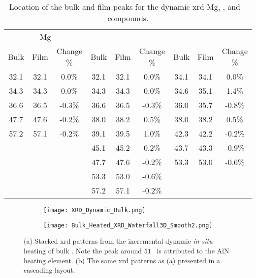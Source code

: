 \documentclass[a4paper,12pt,oneside]{article}%
\begin{document}
\begin{table}[h]
	\centering
	\caption{Location of the bulk and film peaks for the dynamic \acrshort{xrd} Mg, \MgZn, and \CaMgZnFive~ compounds.}
	\begin{tabular}{ c c c c c c c c c }
		\toprule
		\multicolumn{3}{c}{Mg} & \multicolumn{3}{c}{\MgZn} & \multicolumn{3}{c}{\CaMgZnFive} \\
		Bulk & Film & Change \% & Bulk & Film & Change \% & Bulk & Film & Change \% \\
		\midrule
		32.1 & 32.1 & 0.0\%  & 32.1 & 32.1   & 0.0\%  & 34.1 & 34.1 & 0.0\% \\
		34.3 & 34.3 & 0.0\%  & 34.3 & 34.3   & 0.0\%  & 34.6 & 35.1 & 1.4\% \\
		36.6 & 36.5 & -0.3\% & 36.6 & 36.5   & -0.3\% & 36.0 & 35.7 & -0.8\% \\
		47.7 & 47.6 & -0.2\% & 38.0 & 38.2   & 0.5\%  & 38.0 & 38.2 & 0.5\% \\
		57.2 & 57.1 & -0.2\% & 39.1 & 39.5   & 1.0\%  & 42.3 & 42.2 & -0.2\% \\
		&    &      & 45.1   & 45.2 & 0.2\%  & 43.7   & 43.3 & -0.9\% \\
		&    &      & 47.7   & 47.6 & -0.2\% & 53.3   & 53.0 & -0.6\% \\
		&    &      & 53.3   & 53.0 & -0.6\% &        &      &        \\
		&    &      & 57.2   & 57.1 & -0.2\% &        &      &        \\
		\bottomrule
	\end{tabular}
	\label{tab:Annealing_XRD_PeakShift}
\end{table}

\begin{figure}[b]
	\centering
	\begin{subfigure}[htbp]{0.75\textwidth}
		\texttt{[image: XRD\_Dynamic\_Bulk.png]}
		\caption{}
		\label{fig:XRD_Dynamic_FullStack_Bulk}
	\end{subfigure}
	\begin{subfigure}[htbp]{0.75\textwidth}
		\texttt{[image: Bulk\_Heated\_XRD\_Waterfall3D\_Smooth2.png]}
		\caption{}
		\label{fig:XRD_Dynamic_WaterFall_Bulk}
	\end{subfigure}
	\caption{(a) Stacked \acrshort{xrd} patterns from the incremental dynamic \textit{in-situ} heating of bulk \MgZnCa. Note the peak around $51$\degree~ is attributed to the AlN heating element. (b) The same \acrshort{xrd} patterns as (a) presented in a cascading layout.}%
	\label{fig:XRD_Dynamic_Bulk}
\end{figure}
\end{document}
